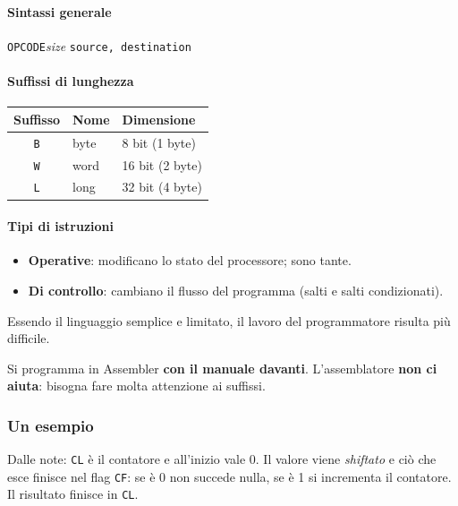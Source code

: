 \documentclass[11pt,a4paper]{article}
\begin{document}
\paragraph*{Sintassi generale}

\begin{center}
\texttt{OPCODE}\emph{size} \texttt{source, destination}
\end{center}

\paragraph*{Suffissi di lunghezza}

\begin{center}
\begin{tabular}{c l l}
\textbf{Suffisso} & \textbf{Nome} & \textbf{Dimensione} \\ \hline
\texttt{B} & byte & 8 bit (1 byte) \\
\texttt{W} & word & 16 bit (2 byte) \\
\texttt{L} & long & 32 bit (4 byte) \\
\end{tabular}
\end{center}

\paragraph*{Tipi di istruzioni}

\begin{itemize}[leftmargin=*]
  \item \textbf{Operative}: modificano lo stato del processore; sono tante.
  \item \textbf{Di controllo}: cambiano il flusso del programma (salti e salti condizionati).
\end{itemize}
Essendo il linguaggio semplice e limitato, il lavoro del programmatore risulta più difficile.

\begin{nota}
Si programma in Assembler \textbf{con il manuale davanti}. L'assemblatore \textbf{non ci aiuta}: bisogna fare molta attenzione ai suffissi.
\end{nota}

\subsubsection*{Un esempio}

Dalle note: \texttt{CL} è il contatore e all'inizio vale 0. Il valore viene \emph{shiftato} e ciò che esce finisce nel flag \texttt{CF}: se è 0 non succede nulla, se è 1 si incrementa il contatore. Il risultato finisce in \texttt{CL}.
\end{document}
